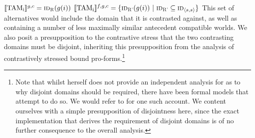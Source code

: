 \a{} $\intension[g,c]{TAM\textsubscript{i}}=\predicate{id\textsubscript{R}}(g(i))$
\a{} $\intension[f,g,c]{TAM\textsubscript{i}}=\{\predicate{id\textsubscript{R'}}(g(i))~|~\predicate{id\textsubscript{R'}}\subseteq \predicate{id}_{\langle s,s\rangle}\}$
\xe
This set of alternatives would include the domain that it is contrasted against, as well as containing a number of less maximally similar antecedent compatible worlds. We also posit a presupposition to the contrastive stress that the two contrasting domains must be disjoint, inheriting this presupposition from the analysis of contrastively stressed bound pro-forms.\footnote{Note that whilst \textcite{Jacobson2000,Jacobson2004} herself does not provide an independent analysis for as to why disjoint domains should be required, there have been formal models that attempt to do so. We would refer to \textcite[p.~321 ff.]{Mayr2012} for one such account. We content ourselves with a simple presupposition of disjointness here, since the exact implementation that derives the requirement of disjoint domains is of no further consequence to the overall analysis.}

